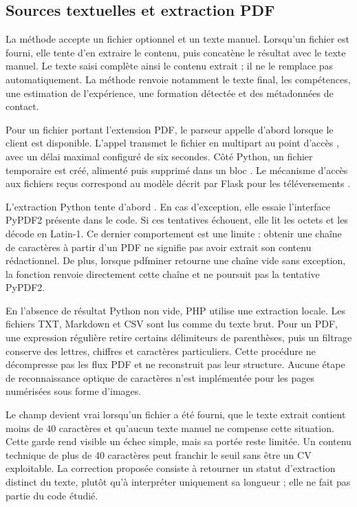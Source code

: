 \subsection{Sources textuelles et extraction PDF}

La méthode  accepte un fichier optionnel et un texte manuel. Lorsqu'un fichier est fourni, elle tente d'en extraire le contenu, puis concatène le résultat avec le texte manuel. Le texte saisi complète ainsi le contenu extrait ; il ne le remplace pas automatiquement. La méthode renvoie notamment le texte final, les compétences, une estimation de l'expérience, une formation détectée et des métadonnées de contact.

Pour un fichier portant l'extension PDF, le parseur appelle d'abord  lorsque le client est disponible. L'appel transmet le fichier en multipart au point d'accès , avec un délai maximal configuré de six secondes. Côté Python, un fichier temporaire est créé, alimenté puis supprimé dans un bloc . Le mécanisme d'accès aux fichiers reçus correspond au modèle décrit par Flask pour les téléversements \cite{flask-docs}.

L'extraction Python tente d'abord . En cas d'exception, elle essaie l'interface PyPDF2 présente dans le code. Si ces tentatives échouent, elle lit les octets et les décode en Latin-1. Ce dernier comportement est une limite : obtenir une chaîne de caractères à partir d'un PDF ne signifie pas avoir extrait son contenu rédactionnel. De plus, lorsque pdfminer retourne une chaîne vide sans exception, la fonction renvoie directement cette chaîne et ne poursuit pas la tentative PyPDF2.

En l'absence de résultat Python non vide, PHP utilise une extraction locale. Les fichiers TXT, Markdown et CSV sont lus comme du texte brut. Pour un PDF, une expression régulière retire certains délimiteurs de parenthèses, puis un filtrage conserve des lettres, chiffres et caractères particuliers. Cette procédure ne décompresse pas les flux PDF et ne reconstruit pas leur structure. Aucune étape de reconnaissance optique de caractères n'est implémentée pour les pages numérisées sous forme d'images.

Le champ  devient vrai lorsqu'un fichier a été fourni, que le texte extrait contient moins de 40 caractères et qu'aucun texte manuel ne compense cette situation. Cette garde rend visible un échec simple, mais sa portée reste limitée. Un contenu technique de plus de 40 caractères peut franchir le seuil sans être un CV exploitable. La correction proposée consiste à retourner un statut d'extraction distinct du texte, plutôt qu'à interpréter uniquement sa longueur ; elle ne fait pas partie du code étudié.

